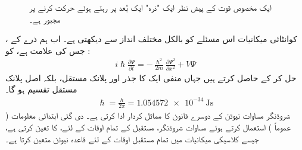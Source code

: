  \begin{figure}
 \centering
 \caption{ایک مخصوص قوت کے پیش نظر ایک "ذرہ" ایک بُعد پر رہتے ہوئے حرکت کرنے پر مجبور ہے۔}
 \label{شکل_تفاعل_موج_حرکت_یک_بعدی}
 \end{figure}
کوانٹائی میکانیات اس مسئلے کو بالکل مختلف انداز سے  دیکھتی  ہے۔ اب ہم ذرے کے  ،  جس کی علامت  ہے،   کو :
\begin{align}\label{مساوات_تفاعل_موج_شروڈنگر_الف}
 i \hslash \frac{\partial \Psi}{\partial t} = - \frac{\hslash^{2}}{2m} \frac{\partial \Psi^{2}}{\partial x^{2}} + V \Psi
\end{align}
حل کر کے حاصل کرتے ہیں جہاں    منفی ایک  کا جذر  اور   پلانک  مستقل، بلکہ اصل پلانک مستقل تقسیم     ہو گا۔
\begin{align}
 \hslash = \frac{h}{2\pi} = \SI{1.054572e-34}{\joule\second} 
\end{align}
شروڈنگر  مساوات نیوٹن کے دوسرے قانون کا مماثل کردار ادا کرتی ہے۔ دی گئی ابتدائی معلومات ( عموماً  )   استعمال کرتے ہوئے  مساوات شروڈنگر،  مستقبل کے تمام اوقات کے لئے،  کا  تعین کرتی ہے، جیسے  کلاسیکی میکانیات میں تمام مستقبل اوقات کے لئے  قاعدہ نیوٹن    متعین کرتا ہے۔ 
 

